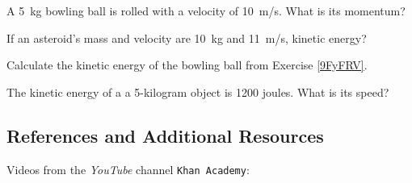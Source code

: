 \documentclass[main.tex]{subfiles}
\begin{document}
\begin{exercise} \label{9FyFRV}
    A \SI{5}{kg} bowling ball is rolled with a velocity of \SI{10}{m/s}. What is its momentum?
\end{exercise}


\begin{exercise} \label{5CHfrd}
    If an asteroid's mass and velocity are \SI{10}{kg} and \SI{11}{m/s}, kinetic energy?
\end{exercise}

\begin{exercise} \label{s9xduj}
    Calculate the kinetic energy of the bowling ball from Exercise \ref{9FyFRV}.
\end{exercise}

\begin{exercise} \label{pVdq3i}
    The kinetic energy of a a 5-kilogram object is 1200 joules. What is its speed?
\end{exercise}


\clearpage
\printnoidxglossaries

\clearpage

\subsection*{References and Additional Resources}

Videos from the \textit{YouTube} channel \texttt{Khan Academy}:
\vspace{-1ex}
\end{document}
